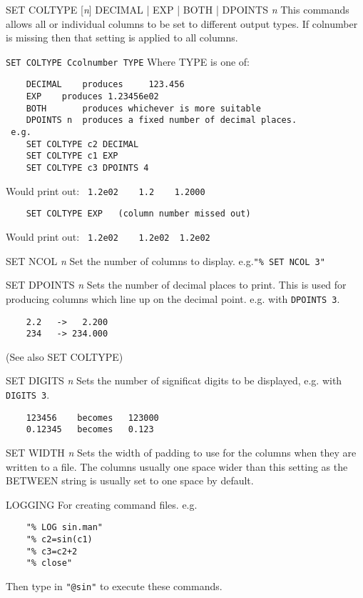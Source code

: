 \begin{commanddescription}
\item[{\sf SET COLTYPE [{\it n}] DECIMAL | EXP | BOTH | DPOINTS {\it n}}]
This commands allows all or individual columns to be set to
different output types.  If colnumber is missing then that
setting is applied to all columns.

\verb#SET COLTYPE Ccolnumber TYPE#  Where {\sf TYPE} is one of:
\begin{verbatim}
	DECIMAL    produces 	123.456
	EXP	   produces	1.23456e02
	BOTH       produces whichever is more suitable
	DPOINTS n  produces a fixed number of decimal places.
 e.g.
	SET COLTYPE c2 DECIMAL
	SET COLTYPE c1 EXP
	SET COLTYPE c3 DPOINTS 4
\end{verbatim}
Would print out: \verb# 1.2e02 	  1.2    1.2000#
\begin{verbatim}
	SET COLTYPE EXP   (column number missed out)
\end{verbatim}
Would print out: \verb# 1.2e02    1.2e02  1.2e02#

\item[{\sf SET NCOL {\it n}}]
 Set the number of columns to display.  e.g.\verb#"% SET NCOL 3"#

\item[{\sf SET DPOINTS {\it n}}]
Sets the number of decimal places to print.  This is used for
producing columns which line up on the decimal point.
e.g. with \verb#DPOINTS 3#.
\begin{verbatim}
	2.2   ->   2.200
	234   -> 234.000
\end{verbatim}
(See also {\sf SET COLTYPE}) 

\item[{\sf SET DIGITS {\it n}}]
Sets the number of significat digits to be displayed, e.g.
with \verb#DIGITS 3#.
\begin{verbatim}
	123456    becomes   123000
	0.12345   becomes   0.123
\end{verbatim}

\item[{\sf SET WIDTH {\it n}}]
Sets the width of padding to use for the columns when they
are written to a file.
The columns usually one space wider than this setting as
the {\sf BETWEEN} string is usually set to one space by default.

\item[{\sf LOGGING}]
For creating command files. e.g.
\begin{verbatim}
	"% LOG sin.man"
	"% c2=sin(c1)
	"% c3=c2+2
	"% close"
\end{verbatim}
Then type in \verb#"@sin"# to execute these commands.


\end{commanddescription}
